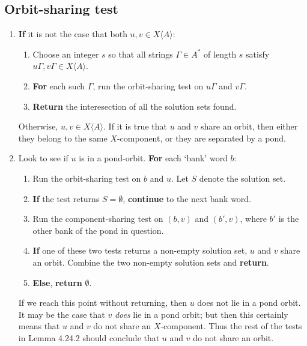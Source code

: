 \documentclass[12pt]{article}
\def\ofA{\langle A \rangle}
\newcommand\alert\textbf
\begin{document}
\subsection*{Orbit-sharing test}
\begin{enumerate}
	\item \alert{If} it is not the case that both $u, v \in X\ofA$:
	\begin{enumerate}
		\item Choose an integer $s$ so that all strings $\Gamma \in A^*$ of length $s$ satisfy $u\Gamma, v\Gamma \in X\ofA$.
		\item \alert{For} each such $\Gamma$, run the orbit-sharing test on $u\Gamma$ and $v\Gamma$.
		\item \alert{Return} the interesection of all the solution sets found.
	\end{enumerate}
	
	Otherwise, $u, v \in X\ofA$. If it is true that $u$ and $v$ share an orbit, then either they belong to the same $X$-component, or they are separated by a pond.
	
	\item Look to see if $u$ is in a pond-orbit. \alert{For} each `bank' word $b$:
	\begin{enumerate}
		\item Run the orbit-sharing test on $b$ and $u$. Let $S$ denote the solution set.
		\item \alert{If} the test returns $S=\emptyset$, \alert{continue} to the next bank word.
		\item Run the component-sharing test on $(b, v)$ and $(b', v)$, where $b'$ is the other bank of the pond in question.
		\item \alert{If} one of these two tests returns a non-empty solution set, $u$ and $v$ share an orbit. Combine the two non-empty solution sets and \alert{return}.
		\item \alert{Else}, \alert{return} $\emptyset$.
	\end{enumerate}
	If we reach this point without returning, then $u$ does not lie in a pond orbit. It may be the case that $v$ \emph{does} lie in a pond orbit; but then this certainly means that $u$ and $v$ do not share an $X$-component. Thus the rest of the tests in Lemma 4.24.2 should conclude that $u$ and $v$ do not share an orbit.
\end{enumerate}
\end{document}
